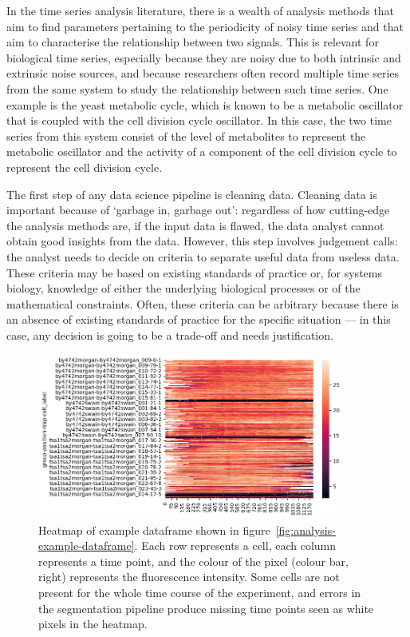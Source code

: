 
In the time series analysis literature, there is a wealth of analysis methods that aim to find parameters pertaining to the periodicity of noisy time series and that aim to characterise the relationship between two signals.
This is relevant for biological time series, especially because they are noisy due to both intrinsic and extrinsic noise sources, and because researchers often record multiple time series from the same system to study the relationship between such time series.
One example is the yeast metabolic cycle, which is known to be a metabolic oscillator that is coupled with the cell division cycle oscillator.
In this case, the two time series from this system consist of the level of metabolites to represent the metabolic oscillator and the activity of a component of the cell division cycle to represent the cell division cycle.

The first step of any data science pipeline is cleaning data.%
Cleaning data is important because of `garbage in, garbage out': regardless of how cutting-edge the analysis methods are, if the input data is flawed, the data analyst cannot obtain good insights from the data.
However, this step involves judgement calls: the analyst needs to decide on criteria to separate useful data from useless data.
These criteria may be based on existing standards of practice or, for systems biology, knowledge of either the underlying biological processes or of the mathematical constraints.
Often, these criteria can be arbitrary because there is an absence of existing standards of practice for the specific situation --- in this case, any decision is going to be a trade-off and needs justification.

\begin{figure}
  \centering
  \includegraphics[width=0.9\textwidth]{example_dataframe_heatmap}
  \caption[
    Heatmap of example dataframe
  ]{
    Heatmap of example dataframe shown in figure~\ref{fig:analysis-example-dataframe}.
    Each row represents a cell, each column represents a time point, and the colour of the pixel (colour bar, right) represents the fluorescence intensity.
    Some cells are not present for the whole time course of the experiment, and errors in the segmentation pipeline produce missing time points seen as white pixels in the heatmap.
  }
  \label{fig:analysis-example-heatmap}
\end{figure}

